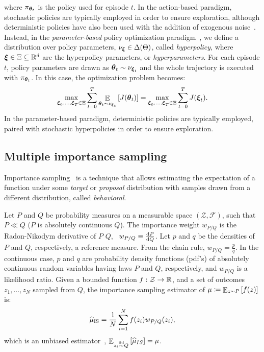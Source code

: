 \documentclass{article}
\begin{document}
where $\pi_{\boldsymbol{\theta}_t}$ is the policy used for episode $t$.
In the action-based paradigm, stochastic policies are typically employed in order to ensure exploration, although deterministic policies have also been used with the addition of exogenous noise~\citep{silver2014deterministic}.
Instead, in the \textit{parameter-based} policy optimization paradigm~\citep{sehnke2008policy}, we define a distribution over policy parameters, $\nu_{\boldsymbol{\xi}}\in\Delta(\Theta)$, called \textit{hyperpolicy}, where $\boldsymbol{\xi}\in\Xi\subseteq\mathbb{R}^d$ are the hyperpolicy parameters, or \textit{hyperparameters}. For each episode $t$, policy parameters are drawn as $\boldsymbol{\theta}_t\sim\nu_{\boldsymbol{\xi}_t}$ and the whole trajectory is executed with $\pi_{\boldsymbol{\theta}_t}$. In this case, the optimization problem becomes:
\begin{align}\label{eq:Jx}
	\max_{\boldsymbol{\xi}_0,\dots,\boldsymbol{\xi}_T\in\Xi} \sum_{t=0}^T\mathop{\mathbb{E}}_{\boldsymbol{\theta}_t\sim\nu_{\boldsymbol{\xi}_t}}\left[J(\boldsymbol{\theta}_t)\right] = \max_{\boldsymbol{\xi}_0,\dots,\boldsymbol{\xi}_T\in\Xi} \sum_{t=0}^T J(\boldsymbol{\xi}_t).
\end{align}
In the parameter-based paradigm, deterministic policies are typically employed, paired with stochastic hyperpolicies in order to ensure exploration.

\subsection{Multiple importance sampling}
Importance sampling~\citep{cochran2007sampling,mcbook} is a technique that allows estimating the expectation of a function under some \textit{target} or \textit{proposal} distribution with samples drawn from a different distribution, called \textit{behavioral}. 

Let $P$ and $Q$ be probability measures on a measurable space $(\mathcal{Z}, \mathcal{F})$, such that $P\ll Q$ (\ie $P$ is absolutely continuous \wrt $Q$). The importance weight $w_{P/Q}$ is the Radon-Nikodym derivative of $P$ \wrt $Q$, \ie~$w_{P/Q} \equiv \frac{\mathrm{d} P}{\mathrm{d} Q}$. Let $p$ and $q$ be the densities of $P$ and $Q$, respectively, \wrt a reference measure. From the chain rule, $w_{P/Q} = \frac{p}{q}$. In the continuous case, $p$ and $q$ are probability density functions (pdf's) of absolutely continuous random variables having laws $P$ and $Q$, respectively, and $w_{P/Q}$ is a likelihood ratio. 
Given a bounded function $f:\mathcal{Z}\to\mathbb{R}$, and a set of \iid outcomes $z_1,\dots,z_N$ sampled from $Q$, the importance sampling estimator of $\mu\coloneqq\mathop{\mathbb{E}}_{z\sim P}\left[f(z)\right]$ is:
\begin{align}\label{eq:ise}
	\widehat{\mu}_{\text{IS}} = \frac{1}{N}\sum_{i=1}^{N}f(z_i)w_{P/Q}(z_i),
\end{align}
which is an unbiased estimator~\cite{mcbook}, \ie ${\mathop{\mathbb{E}}_{z_i\stackrel{\text{iid}}{\sim} Q}\left[\widehat{\mu}_{IS}\right] = \mu}$. 
\end{document}
